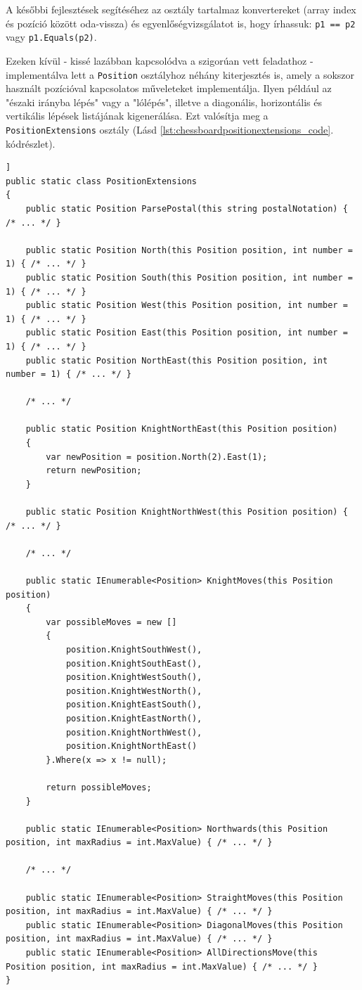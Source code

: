 \documentclass[twoside, a4paper, 12pt]{article}
\begin{document}
A későbbi fejlesztések segítéséhez az osztály tartalmaz konvertereket (array index és pozíció között oda-vissza) és egyenlőségvizsgálatot is, hogy írhassuk: \texttt{p1 == p2} vagy \texttt{p1.Equals(p2)}.

Ezeken kívül - kissé lazábban kapcsolódva a szigorúan vett feladathoz - implementálva lett a \texttt{Position} osztályhoz néhány kiterjesztés is, amely a sokszor használt pozícióval kapcsolatos műveleteket implementálja. Ilyen például az "északi irányba lépés" vagy a "lólépés", illetve a diagonális, horizontális és vertikális lépések listájának kigenerálása. Ezt valósítja meg a \texttt{PositionExtensions} osztály (Lásd \ref{lst:chessboardpositionextensions_code}. kódrészlet).

\begin{lstlisting}[caption=Pozíciók segédfüggvényes - PositionExtensions osztály, label=lst:chessboardpositionextensions_code, float,floatplacement=H]]
public static class PositionExtensions
{
	public static Position ParsePostal(this string postalNotation) { /* ... */ }
	
	public static Position North(this Position position, int number = 1) { /* ... */ }
	public static Position South(this Position position, int number = 1) { /* ... */ }
	public static Position West(this Position position, int number = 1) { /* ... */ }
	public static Position East(this Position position, int number = 1) { /* ... */ }
	public static Position NorthEast(this Position position, int number = 1) { /* ... */ }
	
	/* ... */
	
	public static Position KnightNorthEast(this Position position)
	{
		var newPosition = position.North(2).East(1);
		return newPosition;
	}
	
	public static Position KnightNorthWest(this Position position) { /* ... */ }
	
	/* ... */
	
	public static IEnumerable<Position> KnightMoves(this Position position)
	{
		var possibleMoves = new []
		{
			position.KnightSouthWest(),
			position.KnightSouthEast(),
			position.KnightWestSouth(),
			position.KnightWestNorth(),
			position.KnightEastSouth(),
			position.KnightEastNorth(),
			position.KnightNorthWest(),
			position.KnightNorthEast()
		}.Where(x => x != null);
		
		return possibleMoves;
	}
	
	public static IEnumerable<Position> Northwards(this Position position, int maxRadius = int.MaxValue) { /* ... */ }
	
	/* ... */
	
	public static IEnumerable<Position> StraightMoves(this Position position, int maxRadius = int.MaxValue) { /* ... */ }
	public static IEnumerable<Position> DiagonalMoves(this Position position, int maxRadius = int.MaxValue) { /* ... */ }
	public static IEnumerable<Position> AllDirectionsMove(this Position position, int maxRadius = int.MaxValue) { /* ... */ }
}

\end{lstlisting}
\end{document}
